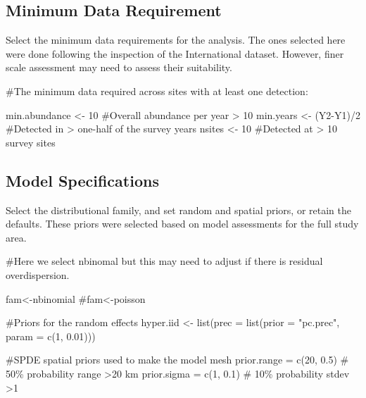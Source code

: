 \documentclass[
  letterpaper,
  DIV=11,
  numbers=noendperiod]{scrreprt}
\newenvironment{Shaded}{\begin{snugshade}}{\end{snugshade}}
\newcommand{\AttributeTok}[1]{\textcolor[rgb]{0.40,0.45,0.13}{#1}}
\newcommand{\CommentTok}[1]{\textcolor[rgb]{0.37,0.37,0.37}{#1}}
\newcommand{\DecValTok}[1]{\textcolor[rgb]{0.68,0.00,0.00}{#1}}
\newcommand{\FloatTok}[1]{\textcolor[rgb]{0.68,0.00,0.00}{#1}}
\newcommand{\FunctionTok}[1]{\textcolor[rgb]{0.28,0.35,0.67}{#1}}
\newcommand{\NormalTok}[1]{\textcolor[rgb]{0.00,0.23,0.31}{#1}}
\newcommand{\OtherTok}[1]{\textcolor[rgb]{0.00,0.23,0.31}{#1}}
\newcommand{\SpecialCharTok}[1]{\textcolor[rgb]{0.37,0.37,0.37}{#1}}
\newcommand{\StringTok}[1]{\textcolor[rgb]{0.13,0.47,0.30}{#1}}
\begin{document}
\subsection{Minimum Data Requirement}\label{3.1.3Analysis}

Select the minimum data requirements for the analysis. The ones selected
here were done following the inspection of the International dataset.
However, finer scale assessment may need to assess their suitability.

\begin{Shaded}
\begin{Highlighting}[]
\CommentTok{\#The minimum data required across sites with at least one detection:}

\NormalTok{min.abundance }\OtherTok{\textless{}{-}} \DecValTok{10} \CommentTok{\#Overall abundance per year \textgreater{} 10}
\NormalTok{min.years }\OtherTok{\textless{}{-}}\NormalTok{ (Y2}\SpecialCharTok{{-}}\NormalTok{Y1)}\SpecialCharTok{/}\DecValTok{2} \CommentTok{\#Detected in \textgreater{} one{-}half of the survey years}
\NormalTok{nsites }\OtherTok{\textless{}{-}} \DecValTok{10} \CommentTok{\#Detected at \textgreater{} 10 survey sites}
\end{Highlighting}
\end{Shaded}

\subsection{Model Specifications}\label{model-specifications}

Select the distributional family, and set random and spatial priors, or
retain the defaults. These priors were selected based on model
assessments for the full study area.

\begin{Shaded}
\begin{Highlighting}[]
\CommentTok{\#Here we select \textquotesingle{}nbinomal\textquotesingle{} but this may need to adjust if there is residual overdispersion. }

\NormalTok{fam}\OtherTok{\textless{}{-}}\StringTok{\textquotesingle{}nbinomial\textquotesingle{}}
\CommentTok{\#fam\textless{}{-}\textquotesingle{}poisson\textquotesingle{}}

\CommentTok{\#Priors for the random effects}
\NormalTok{hyper.iid }\OtherTok{\textless{}{-}} \FunctionTok{list}\NormalTok{(}\AttributeTok{prec =} \FunctionTok{list}\NormalTok{(}\AttributeTok{prior =} \StringTok{"pc.prec"}\NormalTok{, }\AttributeTok{param =} \FunctionTok{c}\NormalTok{(}\DecValTok{1}\NormalTok{, }\FloatTok{0.01}\NormalTok{)))}

\CommentTok{\#SPDE spatial priors used to make the model mesh}
\NormalTok{prior.range }\OtherTok{=} \FunctionTok{c}\NormalTok{(}\DecValTok{20}\NormalTok{, }\FloatTok{0.5}\NormalTok{)  }\CommentTok{\# 50\% probability range \textgreater{}20 km  }
\NormalTok{prior.sigma }\OtherTok{=} \FunctionTok{c}\NormalTok{(}\DecValTok{1}\NormalTok{, }\FloatTok{0.1}\NormalTok{)   }\CommentTok{\# 10\% probability stdev \textgreater{}1 }
\end{Highlighting}
\end{Shaded}
\end{document}
